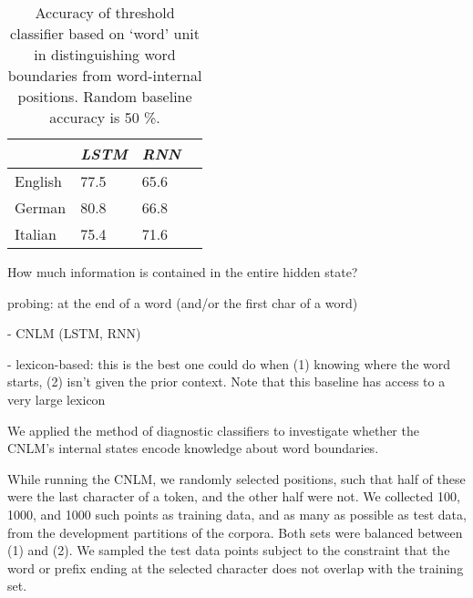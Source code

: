 \begin{table}[t]
	\small
  \begin{center}
    \begin{tabular}{l|l|l|l}
      \multicolumn{1}{c|}{}&\emph{LSTM}&\emph{RNN}\\
      \hline
	    English & 77.5 & 65.6  \\ 
	    German & 80.8 & 66.8 \\ 
	    Italian & 75.4 & 71.6  \\ 
    \end{tabular}
  \end{center}
  \caption{\label{tab:segmentation-neuron-results} Accuracy of threshold classifier based on `word' unit in distinguishing word boundaries from word-internal positions. Random baseline accuracy is 50 \%.}
\end{table}






How much information is contained in the entire hidden state?




probing: at the end of a word (and/or the first char of a word)

- CNLM (LSTM, RNN)

- lexicon-based: this is the best one could do when (1) knowing where the word starts, (2) isn't given the prior context. Note that this baseline has access to a very large lexicon


We applied the method of diagnostic classifiers to investigate whether the CNLM's internal states encode knowledge about word boundaries.

While running the CNLM, we randomly selected positions, such that half of these were the last character of a token, and the other half were not.
We collected 100, 1000, and 1000 such points as training data, and as many as possible as test data, from the development partitions of the corpora.
Both sets were balanced between (1) and (2).
We sampled the test data points subject to the constraint that the word or prefix ending at the selected character does not overlap with the training set.



